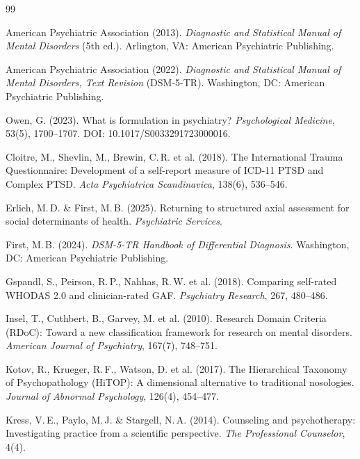 \documentclass[11pt,a4paper]{article}
\begin{document}
\begin{thebibliography}{99}

American Psychiatric Association (2013).
\newblock \textit{Diagnostic and Statistical Manual of Mental Disorders} (5th ed.).
\newblock Arlington, VA: American Psychiatric Publishing.

American Psychiatric Association (2022).
\newblock \textit{Diagnostic and Statistical Manual of Mental Disorders, Text Revision} (DSM-5-TR).
\newblock Washington, DC: American Psychiatric Publishing.

Owen, G. (2023).
\newblock What is formulation in psychiatry?
\newblock \textit{Psychological Medicine}, 53(5), 1700--1707. DOI: 10.1017/S0033291723000016.

Cloitre, M., Shevlin, M., Brewin, C.\,R. et al. (2018).
\newblock The International Trauma Questionnaire: Development of a self-report measure of ICD-11 PTSD and Complex PTSD.
\newblock \textit{Acta Psychiatrica Scandinavica}, 138(6), 536--546.

Erlich, M.\,D. \& First, M.\,B. (2025).
\newblock Returning to structured axial assessment for social determinants of health.
\newblock \textit{Psychiatric Services}.

First, M.\,B. (2024).
\newblock \textit{DSM-5-TR Handbook of Differential Diagnosis}.
\newblock Washington, DC: American Psychiatric Publishing.

Gspandl, S., Peirson, R.\,P., Nahhas, R.\,W. et al. (2018).
\newblock Comparing self-rated WHODAS 2.0 and clinician-rated GAF.
\newblock \textit{Psychiatry Research}, 267, 480--486.

Insel, T., Cuthbert, B., Garvey, M. et al. (2010).
\newblock Research Domain Criteria (RDoC): Toward a new classification framework for research on mental disorders.
\newblock \textit{American Journal of Psychiatry}, 167(7), 748--751.

Kotov, R., Krueger, R.\,F., Watson, D. et al. (2017).
\newblock The Hierarchical Taxonomy of Psychopathology (HiTOP): A dimensional alternative to traditional nosologies.
\newblock \textit{Journal of Abnormal Psychology}, 126(4), 454--477.

Kress, V.\,E., Paylo, M.\,J. \& Stargell, N.\,A. (2014).
\newblock Counseling and psychotherapy: Investigating practice from a scientific perspective.
\newblock \textit{The Professional Counselor}, 4(4).


\end{thebibliography}
\end{document}
